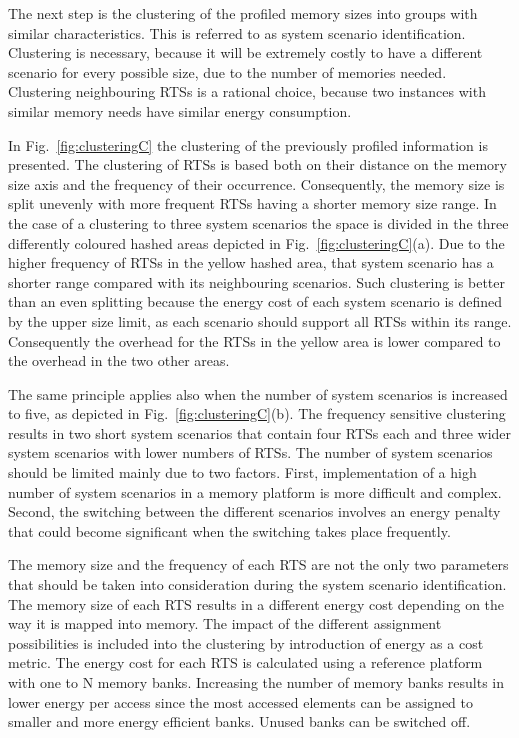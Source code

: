 The next step is the clustering of the profiled memory sizes into groups with similar characteristics. 
This is referred to as system scenario identification. 
Clustering is necessary, because it will be extremely costly to have a different scenario for every possible size, due to the number of memories needed. 
Clustering neighbouring RTSs is a rational choice, because two instances with similar memory needs have similar energy consumption. 

In Fig.~\ref{fig:clusteringC} the clustering of the previously profiled information is presented. 
The clustering of RTSs is based both on their distance on the memory size axis and the frequency of their occurrence. 
Consequently, the memory size is split unevenly with more frequent RTSs having a shorter memory size range. 
In the case of a clustering to three system scenarios the space is divided in the three differently coloured hashed areas depicted in Fig.~\ref{fig:clusteringC}(a). 
Due to the higher frequency of RTSs in the yellow hashed area, that system scenario has a shorter range compared with its neighbouring scenarios. 
Such clustering is better than an even splitting because the energy cost of each system scenario is defined by the upper size limit, as each scenario should support all RTSs within its range. 
Consequently the overhead for the RTSs in the yellow area is lower compared to the overhead in the two other areas.

The same principle applies also when the number of system scenarios is increased to five, as depicted in Fig.~\ref{fig:clusteringC}(b). 
The frequency sensitive clustering results in two short system scenarios that contain four RTSs each and three wider system scenarios with lower numbers of RTSs. 
The number of system scenarios should be limited mainly due to two factors. 
First, implementation of a high number of system scenarios in a memory platform is more difficult and complex. 
Second, the switching between the different scenarios involves an energy penalty that could become significant when the switching takes place frequently.

The memory size and the frequency of each RTS are not the only two parameters that should be taken into consideration during the system scenario identification. 
The memory size of each RTS results in a different energy cost depending on the way it is mapped into memory. 
The impact of the different assignment possibilities is included into the clustering by introduction of energy as a cost metric. 
The energy cost for each RTS is calculated using a reference platform with one to N
memory banks. 
Increasing the number of memory banks results in lower energy per access since the most accessed elements can be assigned to smaller and more energy efficient banks. Unused banks can be switched off.


